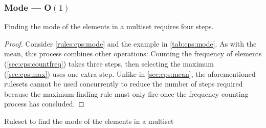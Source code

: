 \subsubsection{Mode --- O\((1)\)}  \label{sec:cps:mode}

\begin{proposition}\label{prop:cps:mode}
Finding the mode of the elements in a multiset requires four steps.
\end{proposition}

\begin{proof}
Consider \cref{rules:cps:mode} and the example in \cref{tab:cps:mode}.  As with the mean, this process combines other operations:  Counting the frequency of elements (\cref{sec:cps:countfreq}) takes three steps, then selecting the maximum (\cref{sec:cps:max}) uses one extra step.  Unlike in \cref{sec:cps:mean}, the aforementioned rulesets cannot be used concurrently to reduce the number of steps required because the maximum-finding rule must only fire once the frequency counting process has concluded.
\end{proof}

\begin{cprulesetfloat} \begin{cpruleset}




\end{cpruleset}
\caption{\label{rules:cps:mode}Ruleset to find the mode of the elements in a multiset}
\end{cprulesetfloat}

    
